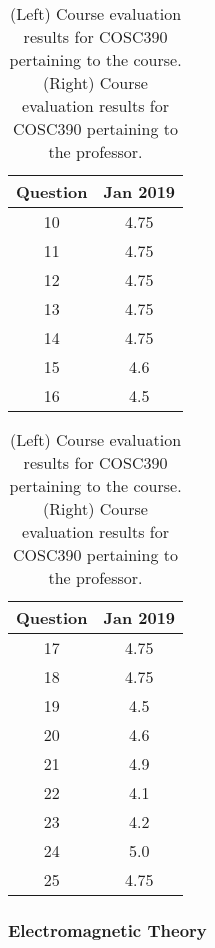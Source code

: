 \documentclass[../../main.tex]{subfiles}
\begin{document}
\begin{table}
\footnotesize
\centering
\begin{tabular}{| c | c |}
\hline
\hline
Question & Jan 2019 \\ \hline
10 & 4.75 \\ \hline
11 & 4.75 \\ \hline
12 & 4.75 \\ \hline
13 & 4.75 \\ \hline
14 & 4.75 \\ \hline
15 & 4.6 \\ \hline
16 & 4.5 \\ \hline
\hline
\end{tabular}
\begin{tabular}{| c | c |}
\hline
\hline
Question & Jan 2019 \\ \hline
17 & 4.75 \\ \hline
18 & 4.75 \\ \hline
19 & 4.5 \\ \hline
20 & 4.6 \\ \hline
21 & 4.9 \\ \hline
22 & 4.1 \\ \hline
23 & 4.2 \\ \hline
24 & 5.0 \\ \hline
25 & 4.75 \\ \hline
\hline
\end{tabular}
\caption{\label{tab:eval_dsp} (Left) Course evaluation results for COSC390 pertaining to the course.  (Right) Course evaluation results for COSC390 pertaining to the professor.}
\end{table}

\subsubsection{Electromagnetic Theory}
\end{document}
